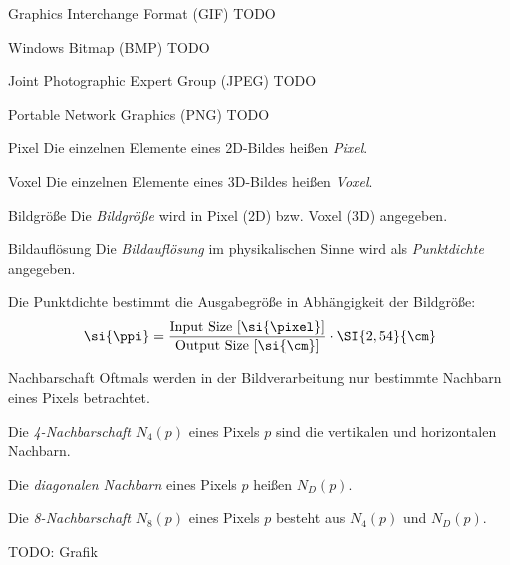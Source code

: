 \begin{defi}{Graphics Interchange Format (GIF)}
    TODO
\end{defi}

\begin{defi}{Windows Bitmap (BMP)}
    TODO
\end{defi}

\begin{defi}{Joint Photographic Expert Group (JPEG)}
    TODO
\end{defi}

\begin{defi}{Portable Network Graphics (PNG)}
    TODO
\end{defi}

\begin{defi}{Pixel}
    Die einzelnen Elemente eines 2D-Bildes heißen \emph{Pixel}.
\end{defi}

\begin{defi}{Voxel}
    Die einzelnen Elemente eines 3D-Bildes heißen \emph{Voxel}.
\end{defi}

\begin{defi}{Bildgröße}
    Die \emph{Bildgröße} wird in Pixel (2D) bzw. Voxel (3D) angegeben.
\end{defi}

\begin{defi}{Bildauflösung}
    Die \emph{Bildauflösung} im physikalischen Sinne wird als \emph{Punktdichte} angegeben.

    Die Punktdichte bestimmt die Ausgabegröße in Abhängigkeit der Bildgröße:
    \[
        \si{\ppi} = \frac{\text{Input Size} \ [\si{\pixel}]}{\text{Output Size} \ [\si{\cm}]} \cdot \SI{2,54}{\cm}
    \]
\end{defi}

\begin{defi}[Bild]{Nachbarschaft}
    Oftmals werden in der Bildverarbeitung nur bestimmte Nachbarn eines Pixels betrachtet.

    Die \emph{4-Nachbarschaft} $N_4(p)$ eines Pixels $p$ sind die vertikalen und horizontalen Nachbarn.

    Die \emph{diagonalen Nachbarn} eines Pixels $p$ heißen $N_D(p)$.

    Die \emph{8-Nachbarschaft} $N_8(p)$ eines Pixels $p$ besteht aus $N_4(p)$ und $N_D(p)$.

    TODO: Grafik
\end{defi}


